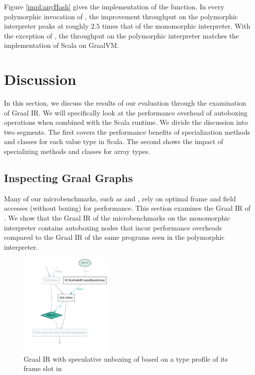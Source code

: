 Figure \ref{impl:anyHash} gives the implementation of the  function.
In every polymorphic invocation of , the improvement throughput on the polymorphic interpreter peaks at roughly $2.5$ times that of the monomorphic interpreter.
With the exception of , the throughput on the polymorphic interpreter matches the implementation of Scala on GraalVM.

\section{Discussion}

In this section, we discuss the results of our evaluation through the examination of Graal IR.
We will specifically look at the performance overhead of autoboxing operations when combined with the Scala runtime.
We divide the discussion into two segments.
The first covers the performance benefits of specialization methods and classes for each value type in Scala.
The second shows the impact of specializing methods and classes for array types.

\subsection{Inspecting Graal Graphs}

Many of our microbenchmarks, such as  and , rely on optimal frame and field accesses (without boxing) for performance.
This section examines the Graal IR of .
We show that the Graal IR of the microbenchmarks on the monomorphic interpreter contains autoboxing nodes that incur performance overheads compared to the Graal IR of the same programs seen in the polymorphic interpreter.

\begin{figure}[!htb]
	\centering
	\includegraphics[width=0.4\textwidth]{figures/dot/List.contains.boxed-param-read.TruffleTier.png}
	\caption{Graal IR with speculative unboxing of  based on a type profile of its frame slot in }
	\label{graalir:cons-contains-param-read}
\end{figure}

